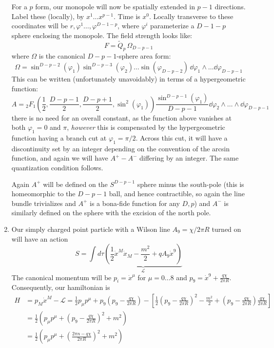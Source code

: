\documentclass[11pt, class=article, crop=false]{standalone}
\begin{document}
\begin{enumerate}
	For a $p$ form, our monopole will now be spatially extended in $p-1$ directions. Label these (locally), by $x^1 \dots x^{p-1}$. Time is $x^0$. Locally transverse to these coordinates will be $r, \varphi^1 \dots, \varphi^{D-1-p}$, where $\varphi^i$ parameterize a $D-1-p$ sphere enclosing the monopole. The field strength looks like:
	\[
		F = \tilde Q_p \, \Omega_{D-p-1}
	\]
	where $\Omega$ is the canonical $D-p-1$-sphere area form:
	\[
		\Omega = \sin^{D-p-2}(\varphi_1) \sin^{D-p-3}(\varphi_2) \dots \sin(\varphi_{D-p-2})\, \dd \varphi_1 \wedge \dots \dd \varphi_{D-p-1}
	\]
	This can be written (unfortunately unavoidably) in terms of a hypergeometric function:
	\[
		A =  {_2 F_1}\left(\frac12, \frac{D-p-1}{2}, \frac{D-p+1}{2}, \sin^2(\varphi_1) \right) \frac{\sin^{D-p-1}(\varphi_1)}{D-p-1} \dd \varphi_2 \wedge \dots \wedge \dd \varphi_{D-p-1}
	\]
	there is no need for an overall constant, as the function above vanishes at both $\varphi_1 = 0$ and $\pi$, \emph{however} this is compensated by the hypergeometric function having a branch cut at $\varphi_1 = \pi/2$. Across this cut, it will have a discontinuity set by an integer depending on the convention of the arcsin function, and again we will have $A^+ - A^-$ differing by an integer.  The same quantization condition follows. 
	
	Again $A^+$ will be defined on the $S^{D-p-1}$ sphere minus the south-pole (this is homeomorphic to the $D-p-1$ ball, and hence contractible, so again the line bundle trivializes and $A^+$ is a bona-fide function for any $D, p$) and $A^-$ is similarly defined on the sphere with the excision of the north pole.
	
	\item Our simply charged point particle with a Wilson line $A_9 = \chi/2\pi R$ turned on will have an action
	\[
		S = \int d \tau \underbrace{\left( \frac12 \dot x^M \dot x_M - \frac{m^2}{2} + q A_9 \dot x^9 \right)}_{\mathcal L}
	\]
	The canonical momentum will be $p_i = \dot x^\mu$ for $\mu = 0 \dots 8$ and $p_9 = \dot x^9 + \frac{q \chi}{2 \pi R}$. Consequently, our hamiltonian is
	\[
	\begin{aligned}
		H &= p_M \dot x^M - \mathcal L = \frac12 p_\mu p^\mu + p_9 (p_9 -  \frac{q \chi}{2 \pi R}) - \left[\frac12 (p_9 - \frac{q \chi}{2\pi R})^2 - \frac{m^2}{2} + (p_9 - \frac{q \chi}{2 \pi R}) \frac{q \chi}{2 \pi R}\right]\\
		&= \frac12 \left(p_\mu p^\mu + (p_9 - \frac{q \chi}{2\pi R})^2 + m^2\right)\\
		&= \frac12 \left(p_\mu p^\mu + \left(\frac{2 \pi n - q \chi}{2\pi R}\right)^2 + m^2\right)
	\end{aligned}
	\]
	

\end{enumerate}
\end{document}
